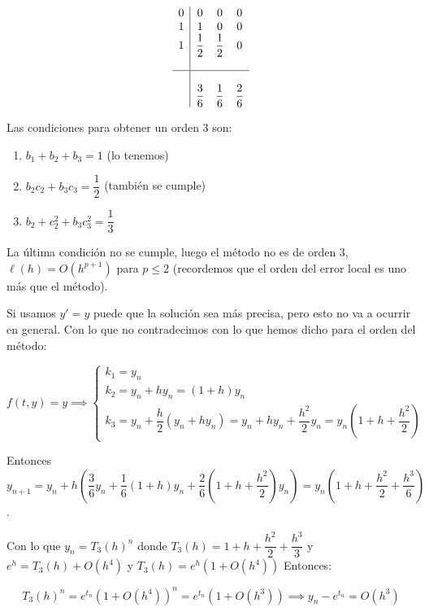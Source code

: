 \documentclass[openany]{book}
\begin{document}
    \setcounter{ex}{3}

    \begin{exercise}
        $$ 
        \begin{array}{c|ccc}
            0 & 0 & 0 & 0\\
            1 & 1 & 0 & 0\\
            1 & \dfrac{1}{2} & \dfrac{1}{2} & 0 \\\\
            \hline\\
            & \dfrac{3}{6} & \dfrac{1}{6} & \dfrac{2}{6}
        \end{array}
        $$

        Las condiciones para obtener un orden 3 son:
        \begin{enumerate}
            \item $ b_1+b_2+b_3 = 1 $ (lo tenemos) 
            \item $ b_2c_2+b_3c_3 = \dfrac{1}{2} $ (también se cumple)
            \item $ b_2+c_2^2+b_3c_3^2 = \dfrac{1}{3} $
        \end{enumerate}
        
        La última condición no se cumple, luego el método no es de orden $ 3 $, $ \ell(h) = O(h^{p+1}) $ para $ p \leq 2 $ (recordemos que el orden del error local es uno más que el método).

        Si usamos $ y'=y $ puede que la solución sea más precisa, pero esto no va a ocurrir en general. Con lo que no contradecimos con lo que hemos dicho para el orden del método:

        $$ f(t,y)=y \implies \left\{
        \begin{array}{l}
            k_1 = y_n\\
            k_2 = y_n+hy_n = (1+h)y_n\\
            k_3 = y_n + \dfrac{h}{2}(y_n+hy_n) = y_n+hy_n+\dfrac{h^2}{2}y_n = y_n\left(1+h+\dfrac{h^2}{2}\right)
        \end{array}
        \right.$$

        Entonces $ y_{n+1} = y_n+h \left( \dfrac{3}{6}y_n + \dfrac{1}{6}(1+h)y_n + \dfrac{2}{6}\left(1+h+\dfrac{h^2}{2}\right) y_n \right) = y_n \left( 1+h+\dfrac{h^2}{2}+\dfrac{h^3}{6} \right) $.

        Con lo que $ y_n = T_{3}(h)^{n} $ donde $ T_{3}(h) = 1+h+\dfrac{h^2}{2}+\dfrac{h^3}{3} $ y $ e^{h} = T_3(h) + O(h^{4}) $ y $ T_3(h) = e^{h}(1+O(h^{4})) $ Entonces:

        $$ T_{3}(h)^{n} =  e^{t_n} (1+O(h^{4}))^{n} = e^{t_n}(1+O(h^{3})) \implies y_n - e^{t_n} = O(h^3)$$

    \end{exercise}
\end{document}
